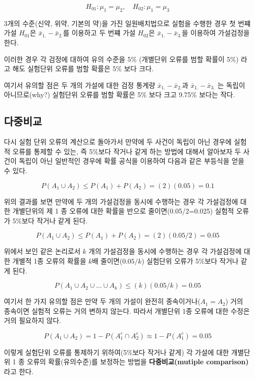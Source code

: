 \documentclass[
]{book}
\theoremstyle{definition}
\theoremstyle{definition}
\theoremstyle{definition}
\theoremstyle{definition}
\theoremstyle{remark}
\begin{document}
\[ H_{01}: \mu_1 = \mu_2, \quad H_{02}: \mu_1 = \mu_3 \]

3개의 수준(신약, 위약, 기본의 약)을 가진 일원배치법으로 실험을 수행한
경우 첫 번쨰 가설 \(H_{01}\)은 \({\bar x}_{1.} - {\bar x}_{2.}\)를 이용하고
두 번쨰 가설 \(H_{02}\)은 \({\bar x}_{1.} - {\bar x}_{3.}\)을 이용하여
가설검정을 한다.

이러한 경우 각 검정에 대하여 유의 수준을 5\% (개별단위 오류를 범할 확률이
5\%) 라고 해도 실험단위 오류를 범할 확률은 5\% 보다 크다.

여기서 유의할 점은 두 개의 가설에 대한 검정 통계량
\({\bar x}_{1.} - {\bar x}_{2.}\)과 \({\bar x}_{1.} - {\bar x}_{3.}\) 는
독립이 아니므로(why?) 실험단위 오류를 범할 확률은 5\% 보다 크고 9.75\%
보다는 작다.

\hypertarget{uxb2e4uxc911uxbe44uxad50-1}{%
\subsection{다중비교}\label{uxb2e4uxc911uxbe44uxad50-1}}

다시 실험 단위 오류의 계산으로 돌아가서 만약에 두 사건이 독립이 아닌
경우에 실험적 오류를 통제할 수 있는, 즉 5\%보다 작거나 같게 하는 방법에
대해서 알아보자 두 사건이 독립이 아닌 일반적인 경우에 확률 공식을
이용하여 다음과 같은 부등식을 얻을 수 있다.

\[ P( A_1 \cup A_2 )  \le  P( A_1 ) + P( A_2 ) = (2)(0.05) = 0.1 \]

위의 결과를 보면 만약에 두 개의 가설검정을 동시에 수행하는 경우 각
가설검정에 대한 개별단위의 제 1 종 오류에 대한 확률을 반으로
줄이면(0.05/2=0.025) 실험적 오류가 5\%보다 작거나 같게 된다.

\[ P( A_1 \cup A_2 )  \le  P( A_1 ) + P( A_2 ) = (2)(0.05/2) = 0.05 \]

위에서 보인 같은 논리로서 \(k\) 개의 가설검정을 동시에 수행하는 경우 각
가설검정에 대한 개별적 1종 오류의 확률을 \(k\)배 줄이면(\(0.05/k\)) 실험단위
오류가 5\%보다 작거나 같게 된다.

\[ P( A_1 \cup A_2 \cup ... \cup A_k )  \le   (k)(0.05/k) = 0.05 \]

여기서 한 가지 유의할 점은 만약 두 개의 가설이 완전히
종속이거나(\(A_1 = A_2\)) 거의 종속이면 실험적 오류는 거의 변하지 않는다.
따라서 개별단위 1종 오류에 대한 수정은 거의 필요하지 않다.

\[ P( A_1 \cup A_2 ) = 1- P(A_1^c \cap A^c_2 ) \approx 1-P(A_1^c) = 0.05 \]

이렇게 실험단위 오류를 통제하기 위하여(5\%보다 작거나 같게) 각 가설에
대한 개별단위 1 종 오류의 확률(유의수준)를 보정하는 방법을
\textbf{다중비교(mutiple comparison)} 라고 한다.
\end{document}
